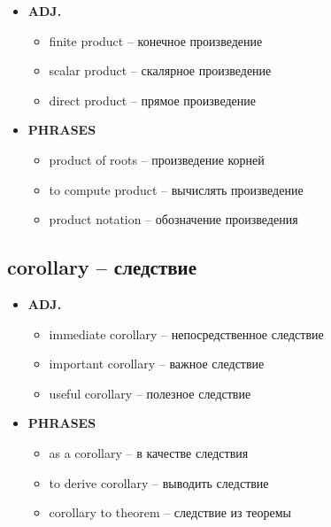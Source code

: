 \documentclass[a4paper, 10pt]{article}
\theoremstyle{definition}
\theoremstyle{plain}
\theoremstyle{remark}
\begin{document}
\begin{itemize}
    \item \textbf{ADJ.}
    \begin{itemize}
        \item finite product – конечное произведение
        \item scalar product – скалярное произведение
        \item direct product – прямое произведение
    \end{itemize}
    
    \item \textbf{PHRASES}
    \begin{itemize}
        \item product of roots – произведение корней
        \item to compute product – вычислять произведение
        \item product notation – обозначение произведения
    \end{itemize}
\end{itemize}

\subsection{corollary – следствие}

\begin{itemize}
    \item \textbf{ADJ.}
    \begin{itemize}
        \item immediate corollary – непосредственное следствие
        \item important corollary – важное следствие
        \item useful corollary – полезное следствие
    \end{itemize}
    
    \item \textbf{PHRASES}
    \begin{itemize}
        \item as a corollary – в качестве следствия
        \item to derive corollary – выводить следствие
        \item corollary to theorem – следствие из теоремы
    \end{itemize}
\end{itemize}
\end{document}
